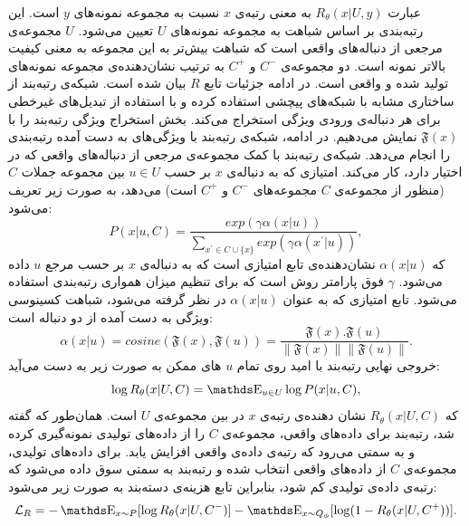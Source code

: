 عبارت
$R_\theta (x | U , y)$
به معنی رتبه‌ی $x$ نسبت به مجموعه نمونه‌های $y$ است. این رتبه‌بندی بر اساس شباهت به مجموعه نمونه‌های $U$ تعیین می‌شود. $U$ مجموعه‌ی مرجعی از دنباله‌های واقعی است که شباهت بیش‌تر به این مجموعه به معنی کیفیت بالاتر نمونه است. دو مجموعه‌ی $C^-$ و $C^+$ به ترتیب نشان‌دهنده‌ی مجموعه نمونه‌های تولید شده و واقعی است. در ادامه جزئیات تابع $R$ بیان شده است.
\newline
شبکه‌ی رتبه‌بند از ساختاری مشابه با شبکه‌های پیچشی
\cite{Xiang15CNN}
استفاده کرده و با استفاده از تبدیل‌های غیرخطی برای هر دنباله‌ی ورودی ویژگی استخراج می‌کند. بخش استخراج ویژگی رتبه‌بند را با
$\mathfrak{F}(x)$
نمایش می‌دهیم. در ادامه، شبکه‌ی رتبه‌بند با ویژگی‌های به دست آمده رتبه‌بندی را انجام می‌دهد. شبکه‌ی رتبه‌بند با کمک مجموعه‌ی مرجعی از دنباله‌های واقعی که در اختیار دارد، کار می‌کند. امتیازی که به دنباله‌ی $x$ بر حسب
$u \in U$
بین مجموعه جملات $C$ (منظور از مجموعه‌ی $C$ مجموعه‌های $C^-$ و $C^+$ است) می‌دهد، به صورت زیر تعریف می‌شود:
\begin{equation}
P(x|u,C)  = \frac{exp(\gamma \alpha(x | u))}{\sum_{x^\prime \in C \cup \{x\}}exp(\gamma \alpha(x^\prime | u))},
\end{equation}
که 
$\alpha(x | u)$
نشان‌دهنده‌ی تابع امتیازی است که به دنباله‌ی
$x$
بر حسب مرجع $u$ داده می‌شود. 
$\gamma$
فوق پارامتر روش است که برای تنظیم میزان همواری رتبه‌بندی استفاده می‌شود. تابع امتیازی که به عنوان
$\alpha(x | u)$
در نظر گرفته می‌شود، شباهت کسینوسی ویژگی به دست آمده از دو دنباله است:
\begin{equation}
\alpha(x | u) = cosine(\mathfrak{F}(x), \mathfrak{F}(u)) =
\frac{\mathfrak{F}(x) . \mathfrak{F}(u)}
{\lVert \mathfrak{F}(x) \rVert  \lVert \mathfrak{F}(u) \rVert}.
\end{equation}
خروجی نهایی رتبه‌بند با امید روی تمام $u$ های ممکن به صورت زیر به دست می‌آید:
\begin{equation}
\log R_\theta (x| U,C) = \ME_{u \in U} \log P (x | u,C),
\end{equation}
که 
$R_\theta (x| U,C)$
نشان دهنده‌ی رتبه‌ی $x$ در بین مجموعه‌ی $U$ است.
همان‌طور که گفته شد، رتبه‌بند برای داده‌های واقعی، مجموعه‌ی $C$ را از داده‌های تولیدی نمونه‌گیری کرده و به سمتی می‌رود که رتبه‌ی داده‌ی واقعی افزایش یابد. برای داده‌های تولیدی، مجموعه‌ی $C$ از داده‌های واقعی انتخاب شده و رتبه‌بند به سمتی سوق داده می‌شود که رتبه‌ی داده‌ی تولیدی کم شود، بنابراین تابع هزینه‌ی دسته‌بند به صورت زیر می‌شود:
\begin{equation}
\mathcal{L}_R = - \ME_{x \sim P} [\log R_\theta (x | U , C^-)] - \ME_{x \sim Q_\phi} [\log (1- R_\theta (x|U,C^+))].
\end{equation}
